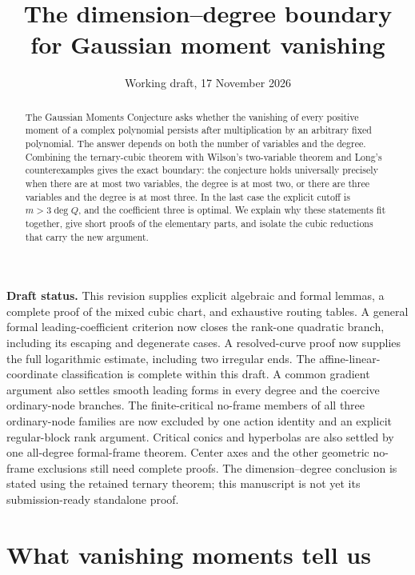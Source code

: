 \documentclass[11pt]{article}
\title{The dimension--degree boundary\\for Gaussian moment vanishing}
\author{}
\date{Working draft, 17 November 2026}
\theoremstyle{definition}\newtheorem{definition}[theorem]{Definition}
\theoremstyle{remark}\newtheorem{remark}[theorem]{Remark}
\begin{document}
\maketitle
\begin{center}\begin{minipage}{0.91\textwidth}\small
\textbf{Draft status.} This revision supplies explicit algebraic and formal
lemmas, a complete proof of the mixed cubic chart, and exhaustive routing
tables. A general formal leading-coefficient criterion now closes the
rank-one quadratic branch, including its escaping and degenerate cases.
A resolved-curve proof now supplies the full logarithmic estimate,
including two irregular ends. The affine-linear-coordinate classification
is complete within this draft. A common gradient argument also settles
smooth leading forms in every degree and the coercive ordinary-node
branches. The finite-critical no-frame members of all three ordinary-node
families are now excluded by one action identity and an explicit
regular-block rank argument. Critical conics and hyperbolas are also settled by one all-degree
formal-frame theorem. Center axes and the other geometric
no-frame exclusions still need
complete proofs. The
dimension--degree conclusion is stated using the retained ternary theorem;
this manuscript is not yet its submission-ready standalone proof.
\end{minipage}\end{center}

\begin{abstract}
The Gaussian Moments Conjecture asks whether the vanishing of every
positive moment of a complex polynomial persists after multiplication by
an arbitrary fixed polynomial. The answer depends on both the number of
variables and the degree. Combining the ternary-cubic theorem with
Wilson's two-variable theorem and Long's counterexamples gives the exact
boundary: the conjecture holds universally precisely when there are at
most two variables, the degree is at most two, or there are three variables
and the degree is at most three. In the last case the explicit cutoff is
$m>3\deg Q$, and the coefficient three is optimal. We explain why these
statements fit together, give short proofs of the elementary parts, and
isolate the cubic reductions that carry the new argument.
\end{abstract}

\section{What vanishing moments tell us}
\end{document}
